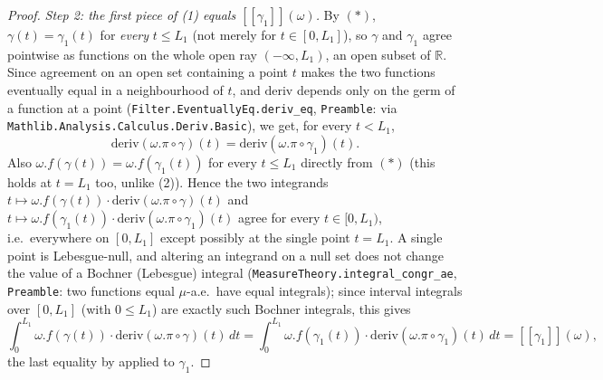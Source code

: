 \begin{proof}
  \emph{Step 2: the first piece of (1) equals $[[\gamma_1]](\omega)$.} By $(\ast)$, $\gamma(t) =
  \gamma_1(t)$ for \emph{every} $t \le L_1$ (not merely for $t \in [0,L_1]$), so
  $\gamma$ and $\gamma_1$ agree pointwise as functions on the whole open ray $(-\infty,L_1)$, an
  open subset of $\mathbb{R}$. Since agreement on an open set containing a point $t$ makes the two
  functions eventually equal in a neighbourhood of $t$, and $\mathrm{deriv}$ depends only on the
  germ of a function at a point (\texttt{Filter.EventuallyEq.deriv\_eq}, \texttt{Preamble}: via
  \texttt{Mathlib.Analysis.Calculus.Deriv.Basic}), we get, for every $t < L_1$,
  \[
    \mathrm{deriv}(\omega.\pi\circ\gamma)(t) = \mathrm{deriv}(\omega.\pi\circ\gamma_1)(t)
    . \tag{2}
  \]
  Also $\omega.f(\gamma(t)) = \omega.f(\gamma_1(t))$ for every $t\le L_1$ directly from $(\ast)$
  (this holds at $t=L_1$ too, unlike (2)). Hence the two integrands
  $t\mapsto\omega.f(\gamma(t))\cdot\mathrm{deriv}(\omega.\pi\circ\gamma)(t)$ and
  $t\mapsto\omega.f(\gamma_1(t))\cdot\mathrm{deriv}(\omega.\pi\circ\gamma_1)(t)$ agree for every $t \in
  [0,L_1)$, i.e.\ everywhere on $[0,L_1]$ except possibly at the single point $t=L_1$. A single point
  is Lebesgue-null, and altering an integrand on a null set does not change the value of a Bochner
  (Lebesgue) integral (\texttt{MeasureTheory.integral\_congr\_ae}, \texttt{Preamble}: two functions
  equal $\mu$-a.e.\ have equal integrals); since interval integrals over $[0,L_1]$ (with $0\le L_1$)
  are exactly such Bochner integrals, this gives
  \[
    \int_0^{L_1} \omega.f(\gamma(t)) \cdot \mathrm{deriv}(\omega.\pi\circ\gamma)(t)\,dt
    = \int_0^{L_1} \omega.f(\gamma_1(t)) \cdot \mathrm{deriv}(\omega.\pi\circ\gamma_1)(t)\,dt
    = [[\gamma_1]](\omega)
    ,
  \]
  the last equality by  applied to $\gamma_1$.


\end{proof}
